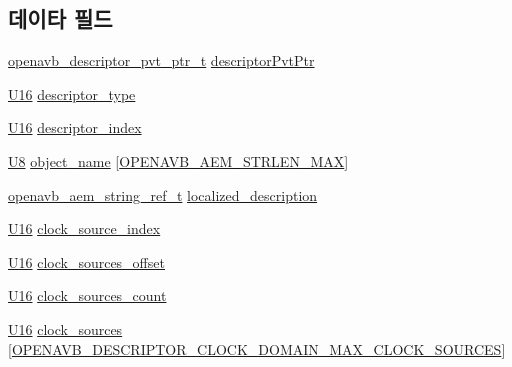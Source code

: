 \subsection*{데이타 필드}
\begin{DoxyCompactItemize}
\item 
\hyperlink{openavb__aem__pub_8h_a85eabab4b7d2466e94c1c3b43b11371d}{openavb\+\_\+descriptor\+\_\+pvt\+\_\+ptr\+\_\+t} \hyperlink{structopenavb__aem__descriptor__clock__domain__t_a302e92fd6cf4d398d5305395359fb157}{descriptor\+Pvt\+Ptr}
\item 
\hyperlink{openavb__types__base__pub_8h_a0a0a322d5fa4a546d293a77ba8b4a71f}{U16} \hyperlink{structopenavb__aem__descriptor__clock__domain__t_a1e231d7874aada5925b29affc76782cc}{descriptor\+\_\+type}
\item 
\hyperlink{openavb__types__base__pub_8h_a0a0a322d5fa4a546d293a77ba8b4a71f}{U16} \hyperlink{structopenavb__aem__descriptor__clock__domain__t_ab26fb363c24b9a2a4391f9171c981b08}{descriptor\+\_\+index}
\item 
\hyperlink{openavb__types__base__pub_8h_aa63ef7b996d5487ce35a5a66601f3e73}{U8} \hyperlink{structopenavb__aem__descriptor__clock__domain__t_a5e98aba8105a7a6d82fac41816c83da3}{object\+\_\+name} \mbox{[}\hyperlink{openavb__aem__types__pub_8h_ab2bb82e9f856a76b8305e4864f23ee58}{O\+P\+E\+N\+A\+V\+B\+\_\+\+A\+E\+M\+\_\+\+S\+T\+R\+L\+E\+N\+\_\+\+M\+AX}\mbox{]}
\item 
\hyperlink{structopenavb__aem__string__ref__t}{openavb\+\_\+aem\+\_\+string\+\_\+ref\+\_\+t} \hyperlink{structopenavb__aem__descriptor__clock__domain__t_afd613361c59409fb6dcc0c237d1cfbfd}{localized\+\_\+description}
\item 
\hyperlink{openavb__types__base__pub_8h_a0a0a322d5fa4a546d293a77ba8b4a71f}{U16} \hyperlink{structopenavb__aem__descriptor__clock__domain__t_ab8a3ce0c7efc03bc176997db162ad53f}{clock\+\_\+source\+\_\+index}
\item 
\hyperlink{openavb__types__base__pub_8h_a0a0a322d5fa4a546d293a77ba8b4a71f}{U16} \hyperlink{structopenavb__aem__descriptor__clock__domain__t_a9760ff6335249494dbb481a576871457}{clock\+\_\+sources\+\_\+offset}
\item 
\hyperlink{openavb__types__base__pub_8h_a0a0a322d5fa4a546d293a77ba8b4a71f}{U16} \hyperlink{structopenavb__aem__descriptor__clock__domain__t_a20ab6d4d800a7b4ec0a52259ed853f27}{clock\+\_\+sources\+\_\+count}
\item 
\hyperlink{openavb__types__base__pub_8h_a0a0a322d5fa4a546d293a77ba8b4a71f}{U16} \hyperlink{structopenavb__aem__descriptor__clock__domain__t_a451c78b4ea1f316f57c72678db062e42}{clock\+\_\+sources} \mbox{[}\hyperlink{openavb__descriptor__clock__domain__pub_8h_afa9be35b47c03c4010c2ad3912e1b06e}{O\+P\+E\+N\+A\+V\+B\+\_\+\+D\+E\+S\+C\+R\+I\+P\+T\+O\+R\+\_\+\+C\+L\+O\+C\+K\+\_\+\+D\+O\+M\+A\+I\+N\+\_\+\+M\+A\+X\+\_\+\+C\+L\+O\+C\+K\+\_\+\+S\+O\+U\+R\+C\+ES}\mbox{]}
\end{DoxyCompactItemize}


